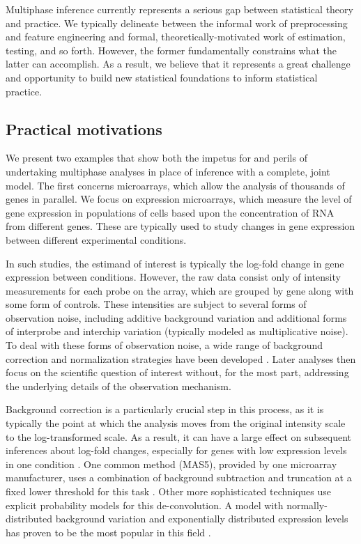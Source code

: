 Multiphase inference currently represents a serious gap between statistical theory and practice.
We typically delineate between the informal work of preprocessing and feature engineering and formal, theoretically-motivated work of estimation, testing, and so forth.
However, the former fundamentally constrains what the latter can accomplish.
As a result, we believe that it represents a great challenge and opportunity to build new statistical foundations to inform statistical practice.

\subsection{Practical motivations}
\label{multiphase:sec:examples}

We present two examples  that show both the impetus for and perils of undertaking multiphase analyses in place of inference with a complete, joint model. The first concerns  microarrays,  which allow the analysis of thousands of genes in parallel.
We focus on expression microarrays, which measure the level of gene expression in populations of cells based upon the concentration of RNA from different genes.
These are typically used to study changes in gene expression between different experimental conditions.

In such studies, the estimand of interest is typically the log-fold change in gene expression between conditions.
However, the raw data consist only of intensity measurements for each probe on the array, which are grouped by gene along with some form of controls.
These intensities are subject to several forms of observation noise, including additive background variation and additional forms of interprobe and interchip variation (typically modeled as multiplicative noise).
To deal with these forms of observation noise, a wide range of background correction and normalization strategies have been developed \citep[for a sampling, see][]{Tusher2001,Quackenbush2002,Affymetrix2002,Irizarry2003,McGee2006,Ritchie2007,Xie2009}.
Later analyses then focus on the scientific question of interest without, for the most part, addressing the underlying details of the observation mechanism.

Background correction is a particularly crucial step in this process, as it is typically the point at which the analysis moves from the original intensity scale to the log-transformed scale.
As a result, it can have a large effect on subsequent inferences about log-fold changes, especially for genes with low expression levels in one condition \citep{Smyth2005,Irizarry2006}.
One common method (MAS5),  provided by one microarray manufacturer, uses a combination of background subtraction and truncation at a fixed lower threshold for this task \citep{Affymetrix2002}. Other more sophisticated techniques use explicit probability models for this de-convolution.
A model with normally-distributed background variation and exponentially distributed expression levels has proven to be the most popular in this field \citep{McGee2006,Xie2009}.

